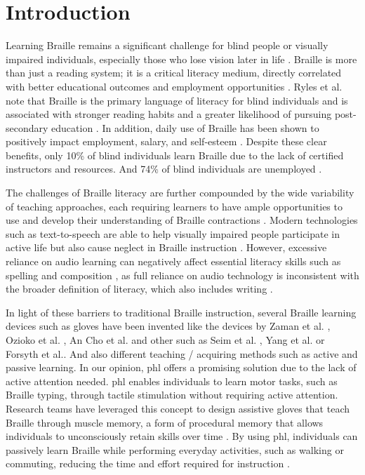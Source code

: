 \chapter{Introduction}
\label{ch:Introduction}

Learning Braille remains a significant challenge for blind people or visually impaired individuals, especially those who lose vision later in life \cite{Seim2014a}. Braille is more than just a reading system; it is a critical literacy medium, directly correlated with better educational outcomes and employment opportunities \cite{Seim2014a, Ryles1996}. Ryles et al. note that Braille is the primary language of literacy for blind individuals and is associated with stronger reading habits and a greater likelihood of pursuing post-secondary education \cite{Ryles1996}. In addition, daily use of Braille has been shown to positively impact employment, salary, and self-esteem \cite{Bell2013}. Despite these clear benefits, only 10\% of blind individuals learn Braille due to the lack of certified instructors and resources. And 74\% of blind individuals are unemployed \cite{Seim2014a}.

The challenges of Braille literacy are further compounded by the wide variability of teaching approaches, each requiring learners to have ample opportunities to use and develop their understanding of Braille contractions \cite{Swenson1999}. Modern technologies such as text-to-speech are able to help visually impaired people participate in active life but also cause neglect in Braille instruction \cite{Seim2014a}. However, excessive reliance on audio learning can negatively affect essential literacy skills such as spelling and composition \cite{Foulke1979}, as full reliance on audio technology is inconsistent with the broader definition of literacy, which also includes writing \cite{tuttle1996point}.

In light of these barriers to traditional Braille instruction, several Braille learning devices such as gloves have been invented like the devices by Zaman et al. \cite{Zaman2019}, Ozioko et al. \cite{Ozioko2017}, An \cite{An2004} Cho et al. \cite{Cho2002} and other such as Seim et al. \cite{Seim2014a, Seim2014, Seim2015}, Yang et al. \cite{Yang2017} or Forsyth et al.\cite{Learning2024}.
And also different teaching / acquiring methods such as active and passive learning. In our opinion, \gls{phl} offers a promising solution due to the lack of active attention needed. \Gls{phl} enables individuals to learn motor tasks, such as Braille typing, through tactile stimulation without requiring active attention. Research teams have leveraged this concept to design assistive gloves that teach Braille through muscle memory, a form of procedural memory that allows individuals to unconsciously retain skills over time \cite{Yang2017, Seim2015}. By using \gls{phl}, individuals can passively learn Braille while performing everyday activities, such as walking or commuting, reducing the time and effort required for instruction \cite{Yang2017}.

